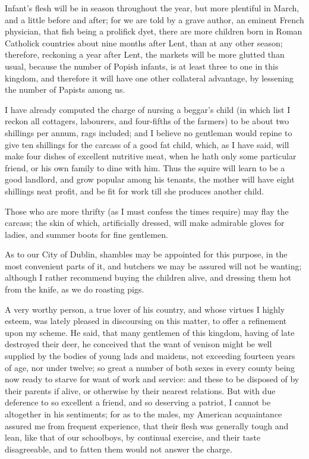 Infant’s flesh will be in season throughout the year, but more plentiful in March, and a little before and after; for we are told by a grave author, an eminent French physician, that fish being a prolifick dyet, there are more children born in Roman Catholick countries about nine months after Lent, than at any other season; therefore, reckoning a year after Lent, the markets will be more glutted than usual, because the number of Popish infants, is at least three to one in this kingdom, and therefore it will have one other collateral advantage, by lessening the number of Papists among us.\par

I have already computed the charge of nursing a beggar’s child (in which list I reckon all cottagers, labourers, and four-fifths of the farmers) to be about two shillings per annum, rags included; and I believe no gentleman would repine to give ten shillings for the carcass of a good fat child, which, as I have said, will make four dishes of excellent nutritive meat, when he hath only some particular friend, or his own family to dine with him. Thus the squire will learn to be a good landlord, and grow popular among his tenants, the mother will have eight shillings neat profit, and be fit for work till she produces another child.\par

Those who are more thrifty (as I must confess the times require) may flay the carcass; the skin of which, artificially dressed, will make admirable gloves for ladies, and summer boots for fine gentlemen.\par

As to our City of Dublin, shambles may be appointed for this purpose, in the most convenient parts of it, and butchers we may be assured will not be wanting; although I rather recommend buying the children alive, and dressing them hot from the knife, as we do roasting pigs.\par

A very worthy person, a true lover of his country, and whose virtues I highly esteem, was lately pleased in discoursing on this matter, to offer a refinement upon my scheme. He said, that many gentlemen of this kingdom, having of late destroyed their deer, he conceived that the want of venison might be well supplied by the bodies of young lads and maidens, not exceeding fourteen years of age, nor under twelve; so great a number of both sexes in every county being now ready to starve for want of work and service: and these to be disposed of by their parents if alive, or otherwise by their nearest relations. But with due deference to so excellent a friend, and so deserving a patriot, I cannot be altogether in his sentiments; for as to the males, my American acquaintance assured me from frequent experience, that their flesh was generally tough and lean, like that of our schoolboys, by continual exercise, and their taste disagreeable, and to fatten them would not answer the charge.\par

